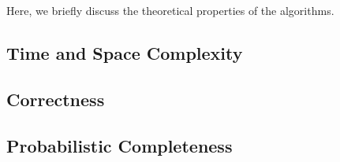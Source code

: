

Here, we briefly discuss the theoretical properties of the algorithms.
\subsection{Time and Space Complexity}

\subsection{Correctness}

\subsection{Probabilistic Completeness}


